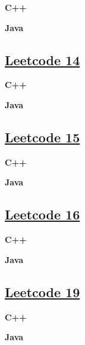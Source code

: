 \textbf{C++}\par


\textbf{Java}\par



\subsection{\href{https://leetcode-cn.com/}{Leetcode 14}}\label{app:codelist:leetcode:14}

\textbf{C++}\par


\textbf{Java}\par



\subsection{\href{https://leetcode-cn.com/}{Leetcode 15}}\label{app:codelist:leetcode:15}

\textbf{C++}\par


\textbf{Java}\par



\subsection{\href{https://leetcode-cn.com/}{Leetcode 16}}\label{app:codelist:leetcode:16}

\textbf{C++}\par


\textbf{Java}\par



\subsection{\href{https://leetcode-cn.com/}{Leetcode 19}}\label{app:codelist:leetcode:19}

\textbf{C++}\par


\textbf{Java}\par



